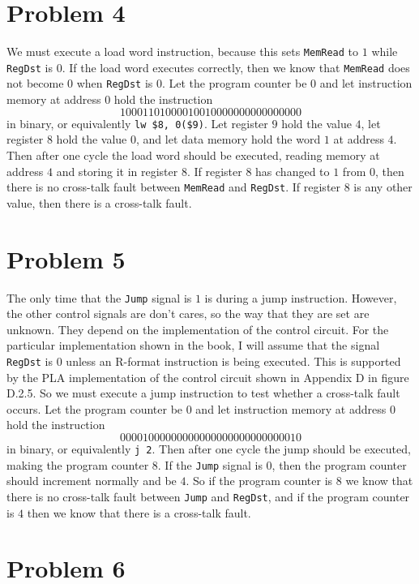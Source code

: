 \documentclass[12pt]{article}
\begin{document}
\section*{Problem 4}

We must execute a load word instruction, because this sets \texttt{MemRead} to \(1\) while \texttt{RegDst} is \(0\). If the
load word executes correctly, then we know that \texttt{MemRead} does not become \(0\) when \texttt{RegDst} is \(0\). Let the program
counter be \(0\) and let instruction memory at address \(0\) hold the instruction
\[10001101000010010000000000000000\]
in binary, or equivalently \texttt{lw \$8, 0(\$9)}. Let register \(9\) hold the value \(4\), let register \(8\) hold the value \(0\),
and let data memory hold the word \(1\) at address \(4\). Then after one cycle the load word should be executed, reading memory at address
\(4\) and storing it in register \(8\). If register \(8\) has changed to \(1\) from \(0\), then there is no cross-talk fault between
\texttt{MemRead} and \texttt{RegDst}. If register \(8\) is any other value, then there is a cross-talk fault.

\section*{Problem 5}

The only time that the \texttt{Jump} signal is \(1\) is during a jump instruction. However, the other control signals are don't cares, so
the way that they are set are unknown. They depend on the implementation of the control circuit. For the particular implementation shown
in the book, I will assume that the signal \texttt{RegDst} is \(0\) unless an R-format instruction is being executed. This is supported by
the PLA implementation of the control circuit shown in Appendix D in figure D.2.5. So we must execute a jump instruction to test whether
a cross-talk fault occurs. Let the program counter be \(0\) and let instruction memory at address \(0\) hold the instruction
\[000010 00 0000 0000 0000 0000 0000 0010\]
in binary, or equivalently \texttt{j 2}. Then after one cycle the jump should be executed, making the program counter \(8\). If the
\texttt{Jump} signal is \(0\), then the program counter should increment normally and be \(4\). So if the program counter is \(8\)
we know that there is no cross-talk fault between \texttt{Jump} and \texttt{RegDst}, and if the program counter is \(4\) then we know
that there is a cross-talk fault.

\section*{Problem 6}
\end{document}
